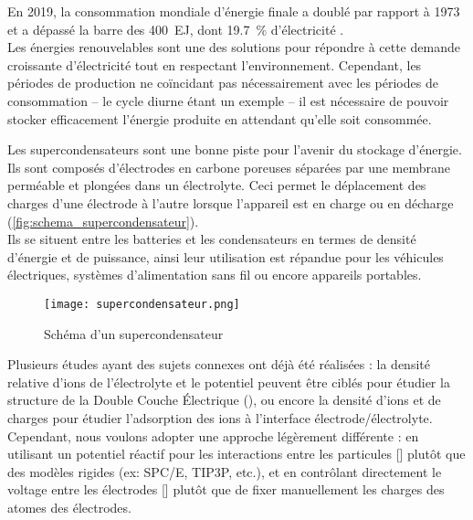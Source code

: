 En 2019, la consommation mondiale d'énergie finale a doublé par rapport à 1973 et a dépassé la barre des \qty{400}{\exa \joule}, dont \qty{19.7}{\percent} d'électricité \cite{birol_key_nodate}.\\
Les énergies renouvelables sont une des solutions pour répondre à cette demande croissante d'électricité tout en respectant l'environnement. Cependant, les périodes de production ne coïncidant pas nécessairement avec les périodes de consommation -- le cycle diurne étant un exemple -- il est nécessaire de pouvoir stocker efficacement l'énergie produite en attendant qu'elle soit consommée.

Les supercondensateurs sont une bonne piste pour l'avenir du stockage d'énergie. Ils sont composés d'électrodes en carbone poreuses séparées par une membrane perméable et plongées dans un électrolyte. Ceci permet le déplacement des charges d'une électrode à l'autre lorsque l'appareil est en charge ou en décharge (\autoref{fig:schema_supercondensateur}).\\
Ils se situent entre les batteries et les condensateurs en termes de densité d'énergie et de puissance, ainsi leur utilisation est répandue pour les véhicules électriques, systèmes d'alimentation sans fil ou encore appareils portables.

\begin{figure}[h!]
    \centering
    \texttt{[image: supercondensateur.png]}
    \caption{Schéma d'un supercondensateur}
    \label{fig:schema_supercondensateur}
\end{figure}

Plusieurs études ayant des sujets connexes ont déjà été réalisées : la densité relative d'ions de l'électrolyte et le potentiel peuvent être ciblés pour étudier la structure de la Double Couche Électrique (\edl{})\cite{jiang_molecular_2016}, ou encore la densité d'ions et de charges pour étudier l'adsorption des ions à l'interface électrode/électrolyte\cite{cole_ion_2011}. Cependant, nous voulons adopter une approche légèrement différente : en utilisant un potentiel réactif pour les interactions entre les particules [\reaxff{}] plutôt que des modèles rigides (ex: SPC/E, TIP3P, etc.), et en contrôlant directement le voltage entre les électrodes [\echemdid{}] plutôt que de fixer manuellement les charges des atomes des électrodes.

